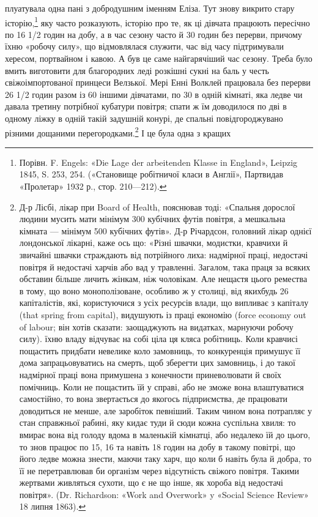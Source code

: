 плуатувала одна пані з добродушним іменням Еліза. Тут знову
викрито стару історію,\footnote{
Порівн. F. Engels: «Die Lage der arbeitenden Klasse in England»,
Leipzig 1845, S. 253, 254. («Становище робітничої класи в Англії»,
Партвидав «Пролетар» 1932 р., стор. 210—212).
} яку часто розказують, історію про те,
як ці дівчата працюють пересічно по 16 1/2 годин на добу, а в час
сезону часто й 30 годин без перерви, причому їхню «робочу силу»,
що відмовлялася служити, час від часу підтримували хересом,
портвайном і кавою. А був це саме найгарячіший час сезону. Треба
було вмить виготовити для благородних леді розкішні сукні на
баль у честь свіжоімпортованої принцеси Велзької. Мері Енні
Волклей працювала без перерви 26 1/2 годин разом із 60 іншими
дівчатами, по 30 в одній кімнаті, яка ледве чи давала третину
потрібної кубатури повітря; спати ж їм доводилося по дві в одному
ліжку в одній такій задушній конурі, де спальні повідгороджувано
різними дощаними перегородками.\footnote{
Д-р Лісбі, лікар при Board of Health, пояснював тоді: «Спальня
дорослої людини мусить мати мінімум 300 кубічних футів повітря, а
мешкальна кімната — мінімум 500 кубічних футів». Д-р Річардсон,
головний лікар однієї лондонської лікарні, каже ось що: «Різні швачки,
модистки, кравчихи й звичайні швачки страждають від потрійного лиха:
надмірної праці, недостачі повітря й недостачі харчів або вад у травленні.
Загалом, така праця за всяких обставин більше личить жінкам, ніж чоловікам.
Але нещастя цього ремества в тому, що воно монополізоване, особливо
ж у столиці, від якихбудь 26 капіталістів, які, користуючися з
усіх ресурсів влади, що випливає з капіталу (that spring from capital),
видушують із праці економію (force economy out of labour; він хотів сказати:
заощаджують на видатках, марнуючи робочу силу). їхню владу
відчуває на собі ціла ця кляса робітниць. Коли кравчисі пощастить придбати
невелике коло замовниць, то конкуренція примушує її дома запрацьовуватись
на смерть, щоб зберегти цих замовниць, і до такої надмірної
праці вона примушена з конечности приневолювати й своїх помічниць.
Коли не пощастить їй у справі, або не зможе вона влаштуватися самостійно,
то вона звертається до якогось підприємства, де працювати доводиться
не менше, але заробіток певніший. Таким чином вона потрапляє у стан
справжньої рабині, яку кидає туди й сюди кожна суспільна хвиля: то вмирає
вона від голоду вдома в маленькій кімнатці, або недалеко їй до цього,
то знов працює по 15, 16 та навіть 18 годин на добу в такому повітрі, що
його ледве можна знести, маючи таку харч, що коли б навіть була й добра,
то її не перетравлював би організм через відсутність свіжого повітря.
Такими жертвами живляться сухоти, що є не що інше, як хороба від недостачі
повітря». (Dr. Richardson: «Work and Overwork» y «Social Science
Review» 18 липня 1863).
} І це була одна з кращих
